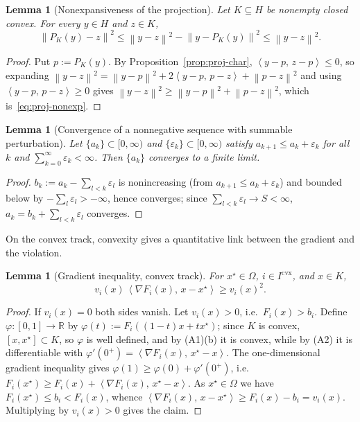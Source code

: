 \documentclass[]{interact}
\theoremstyle{plain}
\newtheorem{lemma}[theorem]{Lemma}
\theoremstyle{definition}
\theoremstyle{remark}
\newcommand{\R}{\mathbb{R}}
\newcommand{\norm}[1]{\left\lVert #1 \right\rVert}
\newcommand{\inner}[2]{\left\langle #1,\, #2 \right\rangle}
\newcommand{\cvx}{\mathrm{cvx}}
\begin{document}
\begin{lemma}[Nonexpansiveness of the projection]\label{lem:proj-nonexp}
Let $K\subseteq H$ be nonempty closed convex. For every $y\in H$ and $z\in K$,
\begin{equation}\label{eq:proj-nonexp}
\norm{P_K(y)-z}^2\le\norm{y-z}^2-\norm{y-P_K(y)}^2\le\norm{y-z}^2 .
\end{equation}
\end{lemma}
\begin{proof}
Put $p:=P_K(y)$. By Proposition~\ref{prop:proj-char}, $\inner{y-p}{z-p}\le0$, so expanding
$\norm{y-z}^2=\norm{y-p}^2+2\inner{y-p}{p-z}+\norm{p-z}^2$ and using $\inner{y-p}{p-z}\ge0$
gives $\norm{y-z}^2\ge\norm{y-p}^2+\norm{p-z}^2$, which is~\eqref{eq:proj-nonexp}.
\end{proof}

\begin{lemma}[Convergence of a nonnegative sequence with summable perturbation]\label{lem:seq}
Let $\{a_k\}\subset[0,\infty)$ and $\{\varepsilon_k\}\subset[0,\infty)$ satisfy
$a_{k+1}\le a_k+\varepsilon_k$ for all $k$ and $\sum_{k=0}^\infty\varepsilon_k<\infty$.
Then $\{a_k\}$ converges to a finite limit.
\end{lemma}
\begin{proof}
$b_k:=a_k-\sum_{l<k}\varepsilon_l$ is nonincreasing (from $a_{k+1}\le a_k+\varepsilon_k$) and
bounded below by $-\sum_l\varepsilon_l>-\infty$, hence converges; since
$\sum_{l<k}\varepsilon_l\to S<\infty$, $a_k=b_k+\sum_{l<k}\varepsilon_l$ converges.
\end{proof}

On the convex track, convexity gives a quantitative link between the gradient and the
violation.

\begin{lemma}[Gradient inequality, convex track]\label{lem:grad-cvx}
For $x^\star\in\Omega$, $i\in I^{\cvx}$, and $x\in K$,
\[
v_i(x)\,\inner{\nabla F_i(x)}{x-x^\star}\ge v_i(x)^2 .
\]
\end{lemma}
\begin{proof}
If $v_i(x)=0$ both sides vanish. Let $v_i(x)>0$, i.e.\ $F_i(x)>b_i$. Define
$\varphi:[0,1]\to\R$ by $\varphi(t):=F_i((1-t)x+tx^\star)$; since $K$ is convex,
$[x,x^\star]\subset K$, so $\varphi$ is well defined, and by (A1)(b) it is convex, while
by (A2) it is differentiable with $\varphi'(0^+)=\inner{\nabla F_i(x)}{x^\star-x}$. The
one-dimensional gradient inequality gives $\varphi(1)\ge\varphi(0)+\varphi'(0^+)$, i.e.
$F_i(x^\star)\ge F_i(x)+\inner{\nabla F_i(x)}{x^\star-x}$. As $x^\star\in\Omega$ we have
$F_i(x^\star)\le b_i<F_i(x)$, whence
$\inner{\nabla F_i(x)}{x-x^\star}\ge F_i(x)-b_i=v_i(x)$. Multiplying by $v_i(x)>0$ gives
the claim.
\end{proof}
\end{document}
